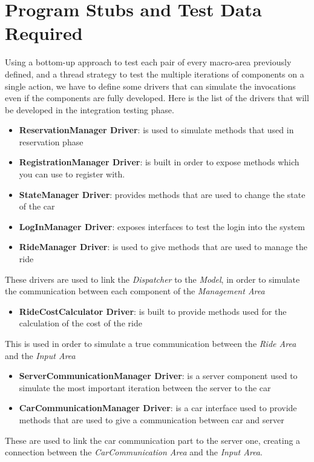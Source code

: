 \documentclass[11pt,a4paper]{report}
\begin{document}
\chapter[Program Stubs and Test Data Required]{Program Stubs and Test Data\\Required}
Using a bottom-up approach to test each pair of every macro-area previously defined, and a thread strategy to test the multiple iterations of components on a single action, we have to define some drivers that can simulate the invocations even if the components are fully developed.
Here is the list of the drivers that will be developed in the integration testing phase.
\begin{itemize}
	\item \textbf{ReservationManager Driver}: is used to simulate methods that used in reservation phase
	\item \textbf{RegistrationManager Driver}: is built in order to expose methods which you can use to register with.
	\item \textbf{StateManager Driver}: provides methods that are used to change the state of the car
	\item \textbf{LogInManager Driver}: exposes interfaces to test the login into the system
	\item \textbf{RideManager Driver}: is used to give methods that are used to manage the ride
\end{itemize}
These drivers are used to link the \textit{Dispatcher} to the \textit{Model}, in order to simulate the communication between each component of the \textit{Management Area}
\begin{itemize}
	\item \textbf{RideCostCalculator Driver}: is built to provide methods used for the calculation of the cost of the ride
\end{itemize}
This is used in order to simulate a true communication between the \textit{Ride Area} and the \textit{Input Area}
\begin{itemize}
	\item \textbf{ServerCommunicationManager Driver}: is a server component used to simulate the most important iteration between the server to the car
	\item \textbf{CarCommunicationManager Driver}: is a car interface used to provide methods that are used to give a communication between car and server
\end{itemize}
These are used to link the car communication part to the server one, creating a connection between the \textit{CarCommunication Area} and the \textit{Input Area}.
\end{document}
